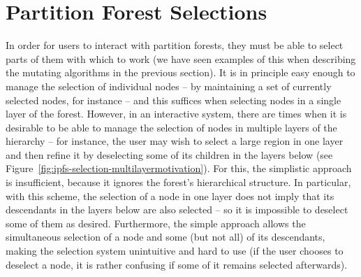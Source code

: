 
\afterpage{\clearpage}
\newpage

\section{Partition Forest Selections}
\label{sec:ipfs-selections}


In order for users to interact with partition forests, they must be able to select parts of them with which to work (we have seen examples of this when describing the mutating algorithms in the previous section). It is in principle easy enough to manage the selection of individual nodes -- by maintaining a set of currently selected nodes, for instance -- and this suffices when selecting nodes in a single layer of the forest. However, in an interactive system, there are times when it is desirable to be able to manage the selection of nodes in multiple layers of the hierarchy -- for instance, the user may wish to select a large region in one layer and then refine it by deselecting some of its children in the layers below (see Figure~\ref{fig:ipfs-selection-multilayermotivation}). For this, the simplistic approach is insufficient, because it ignores the forest's hierarchical structure. In particular, with this scheme, the selection of a node in one layer does not imply that its descendants in the layers below are also selected -- so it is impossible to deselect some of them as desired. Furthermore, the simple approach allows the simultaneous selection of a node and some (but not all) of its descendants, making the selection system unintuitive and hard to use (if the user chooses to deselect a node, it is rather confusing if some of it remains selected afterwards).

